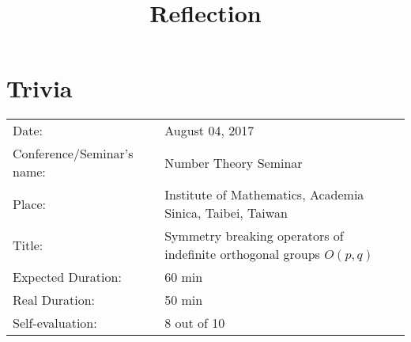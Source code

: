 \documentclass[12pt]{article} %
\title{Reflection}
\theoremstyle{theorem}
\theoremstyle{definition}
\theoremstyle{remark}
\begin{document}
\begin{CJK}{UTF8}{bsmi}
	\maketitle
\end{CJK}

\section{Trivia}
\begin{center}
	\begin{tabular}[]{l|l}
		Date:&August 04, 2017\\
		Conference/Seminar's name:& Number Theory Seminar\\
		Place:& Institute of Mathematics, Academia Sinica, Taibei, Taiwan\\
		Title:&Symmetry breaking operators of indefinite orthogonal groups $O(p,q)$\\
		Expected Duration:&60 min\\
		Real Duration:&50 min\\
		Self-evaluation:& 8 out of 10\\
	\end{tabular}
\end{center}
\end{document}
